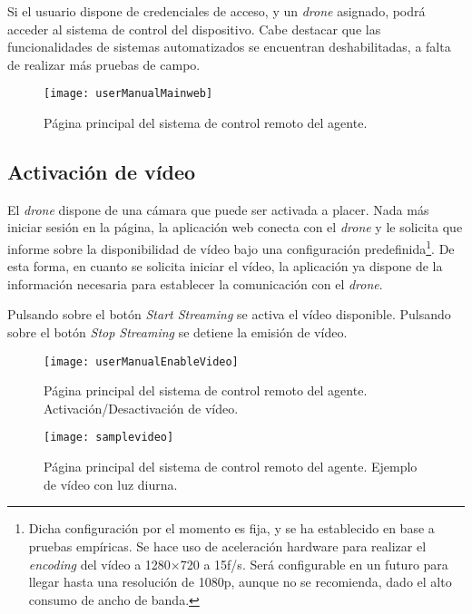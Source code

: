 Si el usuario dispone de credenciales de acceso, y un \emph{drone} asignado, podrá acceder al sistema de control del dispositivo. Cabe destacar que las funcionalidades de sistemas automatizados se encuentran deshabilitadas, a falta de realizar más pruebas de campo.

\begin{figure}[H]
	\centering
	\texttt{[image: userManualMainweb]}
	\caption[Página principal de control del sistema.]{Página principal del sistema de control remoto del agente.}\label{fig:userManualMainweb}
\end{figure}


\subsection{Activación de vídeo}
\label{subsec:videoEnable}
El \emph{drone} dispone de una cámara que puede ser activada a placer. Nada más iniciar sesión en la página, la aplicación web conecta con el \emph{drone} y le solicita que informe sobre la disponibilidad de vídeo bajo una configuración predefinida\footnote{Dicha configuración por el momento es fija, y se ha establecido en base a pruebas empíricas. Se hace uso de aceleración hardware para realizar el \emph{encoding} del vídeo a 1280$\times$720 a 15f/s. Será configurable en un futuro para llegar hasta una resolución de 1080p, aunque no se recomienda, dado el alto consumo de ancho de banda.}. De esta forma, en cuanto se solicita iniciar el vídeo, la aplicación ya dispone de la información necesaria para establecer la comunicación con el \emph{drone}.

Pulsando sobre el botón \emph{Start Streaming} se activa el vídeo disponible. Pulsando sobre el botón \emph{Stop Streaming} se detiene la emisión de vídeo. 

 
\begin{figure}[H]
	\centering
	\texttt{[image: userManualEnableVideo]}
	\caption[Página principal. Gestión de vídeo.]{Página principal del sistema de control remoto del agente. Activación/Desactivación de vídeo.}\label{fig:userManualEnableVideo}
\end{figure}

\begin{figure}[H]
	\centering
	\texttt{[image: samplevideo]}
	\caption[Página principal. Gestión de vídeo.]{Página principal del sistema de control remoto del agente. Ejemplo de vídeo con luz diurna.}\label{fig:samplevideo}
\end{figure}

